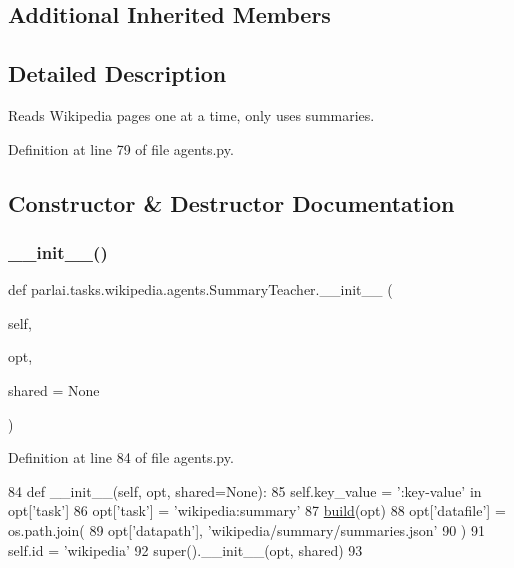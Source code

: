 \subsection*{Additional Inherited Members}


\subsection{Detailed Description}
\begin{DoxyVerb}Reads Wikipedia pages one at a time, only uses summaries.
\end{DoxyVerb}
 

Definition at line 79 of file agents.\+py.



\subsection{Constructor \& Destructor Documentation}
\mbox{\label{classparlai_1_1tasks_1_1wikipedia_1_1agents_1_1SummaryTeacher_af6f404f1debdf8cb2c23dd52ae4acbb7}} 
\subsubsection{\texorpdfstring{\+\_\+\+\_\+init\+\_\+\+\_\+()}{\_\_init\_\_()}}
{\footnotesize\ttfamily def parlai.\+tasks.\+wikipedia.\+agents.\+Summary\+Teacher.\+\_\+\+\_\+init\+\_\+\+\_\+ (\begin{DoxyParamCaption}\item[{}]{self,  }\item[{}]{opt,  }\item[{}]{shared = {\ttfamily None} }\end{DoxyParamCaption})}



Definition at line 84 of file agents.\+py.


\begin{DoxyCode}
84     \textcolor{keyword}{def }\_\_init\_\_(self, opt, shared=None):
85         self.key\_value = \textcolor{stringliteral}{':key-value'} \textcolor{keywordflow}{in} opt[\textcolor{stringliteral}{'task'}]
86         opt[\textcolor{stringliteral}{'task'}] = \textcolor{stringliteral}{'wikipedia:summary'}
87         \hyperlink{namespaceparlai_1_1mturk_1_1tasks_1_1talkthewalk_1_1download_a8c0fbb9b6dfe127cb8c1bd6e7c4e33fd}{build}(opt)
88         opt[\textcolor{stringliteral}{'datafile'}] = os.path.join(
89             opt[\textcolor{stringliteral}{'datapath'}], \textcolor{stringliteral}{'wikipedia/summary/summaries.json'}
90         )
91         self.id = \textcolor{stringliteral}{'wikipedia'}
92         super().\_\_init\_\_(opt, shared)
93 
\end{DoxyCode}


